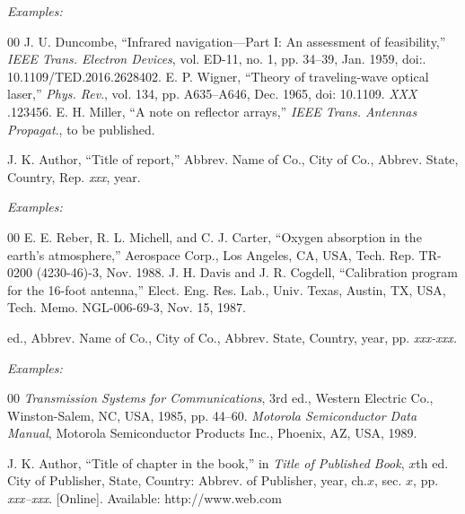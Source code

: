 \documentclass{ieeetj}
\begin{document}
{\it Examples:}

\begin{thebibliography}{00}
 J. U. Duncombe, ``Infrared navigation---Part I: An assessment of feasibility,'' {\it IEEE Trans. Electron Devices}, vol. ED-11, no. 1, pp. 34--39, Jan. 1959, doi:.  {10.1109/TED.2016.2628402}.
 E. P. Wigner, ``Theory of traveling-wave optical laser,''
{\it Phys. Rev}., vol. 134, pp. A635--A646, Dec. 1965, doi:  {10.1109.} {{\it XXX}} {.123456}.
 E. H. Miller, ``A note on reflector arrays,'' {\it IEEE Trans. Antennas Propagat}., to be published.
\end{thebibliography}


\noindent J. K. Author, ``Title of report,'' Abbrev. Name of Co., City of Co., Abbrev.
State, Country, Rep. {\it xxx}, year.

{\it Examples:}

\begin{thebibliography}{00}
 E. E. Reber, R. L. Michell, and C. J. Carter, ``Oxygen absorption in the earth's atmosphere,'' Aerospace Corp., Los Angeles, CA, USA, Tech. Rep. TR-0200 (4230-46)-3, Nov. 1988.
 J. H. Davis and J. R. Cogdell, ``Calibration program for the 16-foot antenna,'' Elect. Eng. Res. Lab., Univ. Texas, Austin, TX, USA, Tech. Memo. NGL-006-69-3, Nov. 15, 1987.
\end{thebibliography}


 ed., Abbrev. Name of Co., City of Co., Abbrev. State, Country, year, pp.
{\it xxx-xxx.}

{\it Examples:}

\begin{thebibliography}{00}
 {\it Transmission Systems for Communications}, 3rd ed., Western Electric Co., Winston-Salem, NC, USA, 1985, pp. 44--60.
 {\it Motorola Semiconductor Data Manual}, Motorola Semiconductor Products Inc., Phoenix, AZ, USA, 1989.
\end{thebibliography}


\noindent J. K. Author, ``Title of chapter in the book,'' in {\it Title of Published Book}, $x$th ed. City of
Publisher, State, Country: Abbrev. of Publisher, year, ch.$x$, sec. $x$, pp.
{\it xxx--xxx}. [Online]. Available:  {http://www.web.com}
\end{document}
